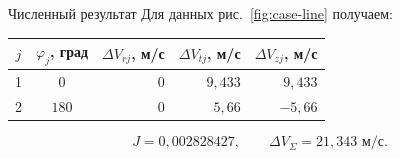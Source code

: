 \begin{explanation}{Численный результат}
Для данных рис.~\ref{fig:case-line} получаем:
\begin{center}\begin{tabular}{cc|rrr}
$j$ & $\varphi_j$, град & $\Delta V_{rj}$, м/с & $\Delta V_{tj}$, м/с & $\Delta V_{zj}$, м/с\\\hline
1 & $0$ & $0$ & $9{,}433$ & $9{,}433$\\
2 & $180$ & $0$ & $5{,}66$ & $-5{,}66$\\
\end{tabular}\end{center}
\[ J=0{,}002828427,\qquad \Delta V_\Sigma=21{,}343\text{ м/с}.\]
\end{explanation}
